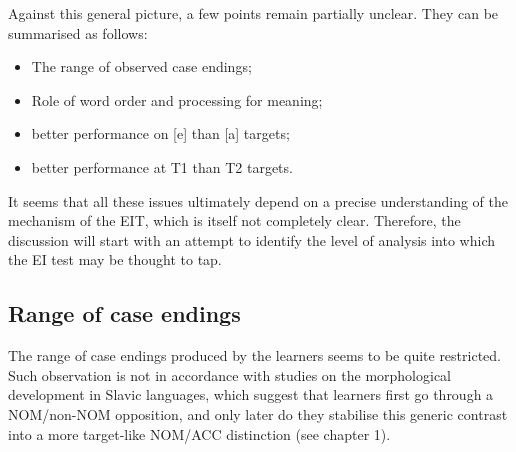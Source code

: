 Against this general picture, a few points remain partially unclear. They can be summarised as follows:

\begin{itemize}
    \item The range of observed case endings;
    \item Role of word order and processing for meaning;
    \item better performance on [e] than [a] targets;
    \item better performance at T1 than T2 targets.
\end{itemize}

It seems that all these issues ultimately depend on a precise understanding of the mechanism of the EIT, which is itself not completely clear. Therefore, the discussion will start with an attempt to identify the level of analysis into which the EI test may be thought to tap. 

\subsection{Range of case endings}\label{sec:08:2.1}

The range of case endings produced by the learners seems to be quite restricted. Such observation is not in accordance with studies on the morphological development in Slavic languages, which suggest that learners first go through a NOM/non-NOM opposition, and only later do they stabilise this generic contrast into a more target-like NOM/ACC distinction (see chapter 1).

